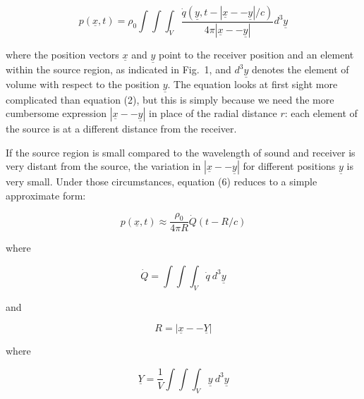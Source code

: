   \begin{equation*}p(\underline{x},t)=\rho_0 \int \int 
  \int_V{\dfrac{\dot{q}(\underline{y},t-|\underline{x} -- \underline{y}|/c)}{4 
  \pi |\underline{x} -- \underline{y}|} d^3 \underline{y}} 
  \tag{6}\end{equation*} 

  \noindent{}where the position vectors $\underline{x}$ and $\underline{y}$ 
  point to the receiver position and an element within the source region, as 
  indicated in Fig.\ 1, and $d^3 \underline{y}$ denotes the element of volume 
  with respect to the position $\underline{y}$. The equation looks at first 
  sight more complicated than equation (2), but this is simply because we need 
  the more cumbersome expression $|\underline{x} -- \underline{y}|$ in place of 
  the radial distance $r$: each element of the source is at a different 
  distance from the receiver. 


  If the source region is small compared to the wavelength of sound and 
  receiver is very distant from the source, the variation in $|\underline{x} -- 
  \underline{y}|$ for different positions $\underline{y}$ is very small. Under 
  those circumstances, equation (6) reduces to a simple approximate form: 

  \begin{equation*}p(\underline{x},t) \approx \dfrac{\rho_0}{4 \pi R} 
  \dot{Q}(t-R/c) \tag{7}\end{equation*} 

  \noindent{}where 

  \begin{equation*}\dot{Q}=\int \int \int_V{\dot{q} \mathrm{~} d^3 
  \underline{y}} \tag{8}\end{equation*} 

  \noindent{}and 

  \begin{equation*}R=|\underline{x} -- \underline{Y}| \tag{9}\end{equation*} 

  \noindent{}where 

  \begin{equation*}\underline{Y}=\dfrac{1}{V} \int \int \int_V{\underline{y} 
  \mathrm{~} d^3\underline{y}} \tag{10}\end{equation*} 

